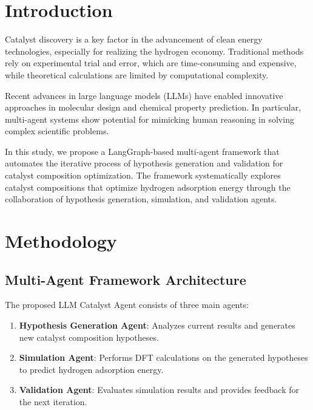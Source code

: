 
\section{Introduction}

Catalyst discovery is a key factor in the advancement of clean energy technologies, especially for realizing the hydrogen economy. Traditional methods rely on experimental trial and error, which are time-consuming and expensive, while theoretical calculations are limited by computational complexity.

Recent advances in large language models (LLMs) have enabled innovative approaches in molecular design and chemical property prediction. In particular, multi-agent systems show potential for mimicking human reasoning in solving complex scientific problems.

In this study, we propose a LangGraph-based multi-agent framework that automates the iterative process of hypothesis generation and validation for catalyst composition optimization. The framework systematically explores catalyst compositions that optimize hydrogen adsorption energy through the collaboration of hypothesis generation, simulation, and validation agents.

\section{Methodology}

\subsection{Multi-Agent Framework Architecture}

The proposed LLM Catalyst Agent consists of three main agents:

\begin{enumerate}
    \item \textbf{Hypothesis Generation Agent}: Analyzes current results and generates new catalyst composition hypotheses.
    \item \textbf{Simulation Agent}: Performs DFT calculations on the generated hypotheses to predict hydrogen adsorption energy.
    \item \textbf{Validation Agent}: Evaluates simulation results and provides feedback for the next iteration.
\end{enumerate}

